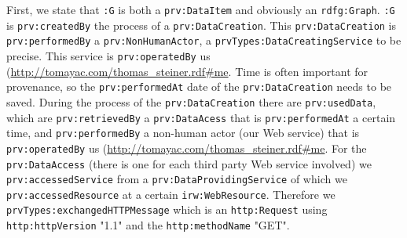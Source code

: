 \documentclass{acm_proc_article-sp}
\begin{document}
First, we state that \texttt{:G} is both a \texttt{prv:DataItem} and obviously an \texttt{rdfg:Graph}. \texttt{:G} is \texttt{prv:createdBy} the process of a \texttt{prv:DataCreation}. This \texttt{prv:DataCreation} is \texttt{prv:performedBy} a \texttt{prv:NonHumanActor}, a 
\texttt{prvTypes:DataCreatingService} to be precise. This service is \texttt{prv:operatedBy} us (\url{http://tomayac.com/thomas_steiner.rdf#me}. Time is often important for provenance, so the \texttt{prv:performedAt} date of the \texttt{prv:DataCreation} needs to be saved. During the process of the \texttt{prv:DataCreation} there are \texttt{prv:usedData}, which are \texttt{prv:retrievedBy} a \texttt{prv:DataAcess} that is \texttt{prv:performedAt} a certain time, and \texttt{prv:performedBy} a non-human actor (our Web service) that is \texttt{prv:operatedBy} us (\url{http://tomayac.com/thomas_steiner.rdf#me}. For the \texttt{prv:DataAccess} (there is one for each third party Web service involved) we \texttt{prv:accessedService} from a \texttt{prv:DataProvidingService} of which we \texttt{prv:accessedResource} at a certain \texttt{irw:WebResource}. Therefore we \texttt{prvTypes:exchangedHTTPMessage} which is an \texttt{http:Request} using \texttt{http:httpVersion} "1.1" and the \texttt{http:methodName} "GET".
\end{document}

